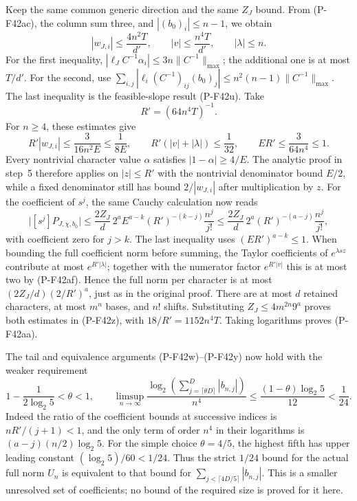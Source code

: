 Keep the same common generic direction and the same
\(Z_J\) bound. From (P-F42ac), the column sum three,
and \(|(b_0)_i|\le n-1\), we obtain
\[
 |w_{J,i}|\le\frac{4n^2T}{d'},\qquad
 |v|\le\frac{n^4T}{d'},\qquad |\lambda|\le n.
 \tag{P-F42ad}
\]
For the first inequality,
\(|\ell_JC^{-1}\alpha_i|\le3n\|C^{-1}\|_{\max}\);
the additional one is at most \(T/d'\).
For the second, use
\(\sum_{i,j}|\ell_i(C^{-1})_{ij}(b_0)_j|
 \le n^2(n-1)\|C^{-1}\|_{\max}\).
The last inequality is the feasible-slope result (P-F42u).
Take
\[
                  R'=(64n^4T)^{-1}.
 \tag{P-F42ae}
\]
For \(n\ge4\), these estimates give
\[
 R'|w_{J,i}|\le\frac{3}{16n^2E}\le\frac1{8E},
 \qquad R'(|v|+|\lambda|)\le\frac1{32},
 \qquad ER'\le\frac{3}{64n^4}\le1.
 \tag{P-F42af}
\]
Every nontrivial character value \(\alpha\) satisfies
\(|1-\alpha|\ge4/E\).
The analytic proof in step~5 therefore applies on
\(|z|\le R'\) with the nontrivial denominator bound \(E/2\),
while a fixed denominator still has bound
\(2/|w_{J,i}|\) after multiplication by \(z\).
For the coefficient of \(s^j\), the same Cauchy calculation
now reads
\[
 \bigl|[s^j]P_{J,\chi,b_0}\bigr|
 \le
 \frac{2Z_J}{d}\,2^a E^{a-k}
           (R')^{-(k-j)}\frac{n^j}{j!}
 \le
 \frac{2Z_J}{d}\,2^a
           (R')^{-(a-j)}\frac{n^j}{j!},
 \tag{P-F42ag}
\]
with coefficient zero for \(j>k\).
The last inequality uses \((ER')^{a-k}\le1\).
When bounding the full coefficient norm before summing,
the Taylor coefficients of \(e^{\lambda sz}\) contribute
at most \(e^{R'|\lambda|}\); together with the numerator
factor \(e^{R'|v|}\) this is at most two by (P-F42af).
Hence the full norm per character is at most
\((2Z_J/d)(2/R')^a\), just as in the original proof.
There are at most \(d\) retained characters, at most \(m^n\)
bases, and \(n!\) shifts. Substituting
\(Z_J\le4m^{2n}9^a\) proves both estimates in (P-F42z),
with \(18/R'=1152n^4T\).
Taking logarithms proves (P-F42aa).

The tail and equivalence arguments (P-F42w)--(P-F42y)
now hold with the weaker requirement
\[
       1-\frac1{2\log_2 5}<\theta<1,
 \qquad
 \limsup_{n\to\infty}
 \frac{\log_2\left(\sum_{j=\lceil\theta D\rceil}^{D}
                            |b_{n,j}|\right)}{n^4}
       \le\frac{(1-\theta)\log_2 5}{12}<\frac1{24}.
 \tag{P-F42ah}
\]
Indeed the ratio of the coefficient bounds at successive
indices is \(nR'/(j+1)<1\), and the only term of order
\(n^4\) in their logarithms is
\((a-j)(n/2)\log_2 5\).
For the simple choice \(\theta=4/5\), the highest fifth
has upper leading constant \((\log_2 5)/60<1/24\).
Thus the strict \(1/24\) bound for the actual full norm
\(U_n\) is equivalent to that bound for
\(\sum_{j<\lceil4D/5\rceil}|b_{n,j}|\).
This is a smaller unresolved set of coefficients;
no bound of the required size is proved for it here.


